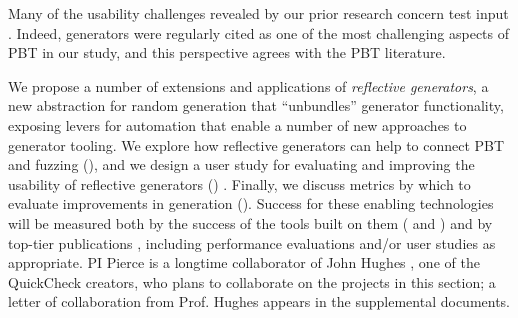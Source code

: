 

Many of the usability challenges revealed by our prior research concern test input
.
Indeed, generators were regularly cited as one of the most challenging
aspects of PBT in our study, and this perspective agrees with the PBT literature.

We propose a number of extensions and applications of {\em reflective
generators}, a new abstraction for random generation that
``unbundles'' generator
functionality, exposing levers for
automation that enable a number of new approaches to generator
tooling. We explore how reflective generators can
help to connect PBT and fuzzing (),
and we design
a user study for evaluating and improving the usability of reflective
generators () . Finally, we discuss metrics
by which to evaluate improvements in generation  ().
Success for these enabling technologies will be measured both by the success of
the tools built on them ( and )
and by top-tier publications , including performance evaluations and/or
user studies as appropriate.
PI Pierce is a longtime collaborator of John Hughes , one of the
QuickCheck creators, who plans to collaborate on the projects
in this section; a letter of collaboration from Prof.{} Hughes appears
in the supplemental documents.

